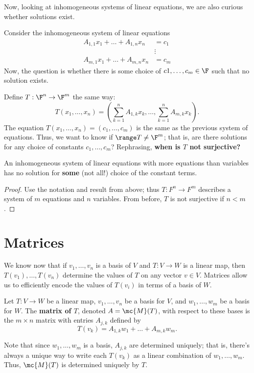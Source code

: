 \documentclass[math0540-lecture-notes.tex]{subfiles}
\begin{document}
Now, looking at inhomogeneous systems of linear equations, we are also curious whether solutions
exist.
\begin{example}
  Consider the inhomogeneous system of linear equations \begin{align*}
    A_{1,1}x_1+\ldots+A_{1,n}x_n&= c_1 \\
                                &\vdots\\
    A_{m,1}x_1+\ldots+A_{m,n}x_n&= c_m
  \end{align*}
  Now, the question is whether there is some choice of $c1,\ldots,c_m\in \F$ such that no solution
  exists.

  Define $T:\F^n\to \F^m$ the same way: \[
    T(x_1,\ldots,x_n)=\left( \sum_{k=1}^{n} A_{1,k}x_k,\ldots,\sum_{k=1}^{n} A_{m,k}x_k \right) 
  .\] The equation $T(x_1,\ldots,x_n)=(c_1,\ldots,c_m)$ is the same as the previous system of
  equations. Thus, we want to know if $ \range T \neq \F^m$; that is, are there solutions for any
  choice of constants $c_1,\ldots,c_m$? Rephrasing, \textbf{when is $T$ not surjective?} 
\end{example}

\begin{proposition}{}
  An inhomogeneous system of linear equations with more equations than variables has no solution for
  \textbf{some} (not all!) choice of the constant terms.
\end{proposition}
\begin{proof}[Proof]
  Use the notation and result from above; thus $T:F^n\to F^m$ describes a system of $m$ equations
  and $n$ variables. From before, $T$ is not surjective if $n<m$.
\end{proof}


\section{Matrices}
We know now that if $v_1,\ldots,v_n$ is a basis of $V$ and $T:V\to W$ is a linear map, then
$T(v_1),\ldots,T(v_n)$ determine the values of $T$ on any vector $v\in V$. Matrices allow us to
efficiently encode the values of $T(v_i)$ in terms of a basis of $W$.

\begin{definition}{}
  Let $T:V\to W$ be a linear map, $v_1,\ldots,v_n$ be a basis for $V$, and $w_1,\ldots,w_m$ be a
  basis for $W$. The \textbf{matrix of $T$}, denoted $A=\mc{M}(T)$, with respect to these bases is the
  $m\times n$ matrix with entries $A_{j,k}$ defined by \[
    T(v_k)=A_{1,k}w_1+\ldots+A_{m,k}w_m
  .\] 
\end{definition}
\begin{remark}
  Note that since $w_1,\ldots,w_m$ is a basis, $A_{j,k}$ are determined uniquely; that is, there's
  always a unique way to write each $T(v_k)$ as a linear combination of $ w_1,\ldots,w_m$. Thus,
  $\mc{M}(T)$ is determined uniquely by $T$.
\end{remark}
\end{document}
